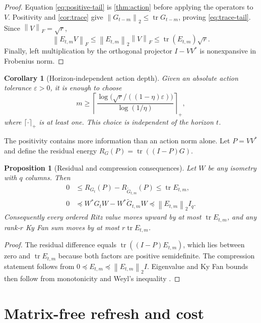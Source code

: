 \documentclass[11pt]{article}
\newtheorem{proposition}[theorem]{Proposition}
\newtheorem{corollary}[theorem]{Corollary}
\theoremstyle{definition}
\theoremstyle{remark}
\newcommand{\norm}[1]{\left\lVert#1\right\rVert}
\newcommand{\tr}{\operatorname{tr}}
\begin{document}
\begin{proof}
Equation \eqref{eq:positive-tail} is \cref{thm:action} before applying the
operators to $V$.  Positivity and \cref{cor:trace} give
$\norm{G_{t-m}}_2\le\tr G_{t-m}$, proving
\eqref{eq:trace-tail}.  Since $\norm V_F=\sqrt r$,
\[
 \norm{E_{t,m}V}_F
 \le\norm{E_{t,m}}_2\norm V_F
 \le\tr(E_{t,m})\sqrt r.
\]
Finally, left multiplication by the orthogonal projector $I-VV^*$ is
nonexpansive in Frobenius norm.
\end{proof}

\begin{corollary}[Horizon-independent action depth]
\label{cor:depth}
Given an absolute action tolerance $\varepsilon>0$, it is enough to choose
\begin{equation}
 m\ge
 \left\lceil
 \frac{\log\!\bigl(\sqrt r/((1-\eta)\varepsilon)\bigr)}
      {\log(1/\eta)}
 \right\rceil_+,
 \label{eq:depth-choice}
\end{equation}
where $\lceil\cdot\rceil_+$ is at least one.  This choice is independent of
the horizon $t$.
\end{corollary}

The positivity contains more information than an action norm alone.  Let
$P=VV^*$ and define the residual energy
$R_G(P)=\tr((I-P)G)$.

\begin{proposition}[Residual and compression consequences]
\label{prop:consequences}
Let $W$ be any isometry with $q$ columns.  Then
\begin{align}
 0&\le R_{G_t}(P)-R_{\widetilde G_{t,m}}(P)
 \le\tr E_{t,m},
 \label{eq:residual-tail}\\
 0&\preceq W^*G_tW-W^*\widetilde G_{t,m}W
 \preceq \norm{E_{t,m}}_2I_q.
 \label{eq:compression-tail}
\end{align}
Consequently every ordered Ritz value moves upward by at most
$\tr E_{t,m}$, and any rank-$r$ Ky Fan sum moves by at most
$r\tr E_{t,m}$.
\end{proposition}

\begin{proof}
The residual difference equals $\tr((I-P)E_{t,m})$, which lies between zero
and $\tr E_{t,m}$ because both factors are positive semidefinite.  The
compression statement follows from $0\preceq E_{t,m}\preceq
\norm{E_{t,m}}_2I$.  Eigenvalue and Ky Fan bounds then follow from monotonicity
and Weyl's inequality \citep{Bhatia1997,HornJohnson2013}.
\end{proof}

\section{Matrix-free refresh and cost}
\label{sec:implementation}
\end{document}
